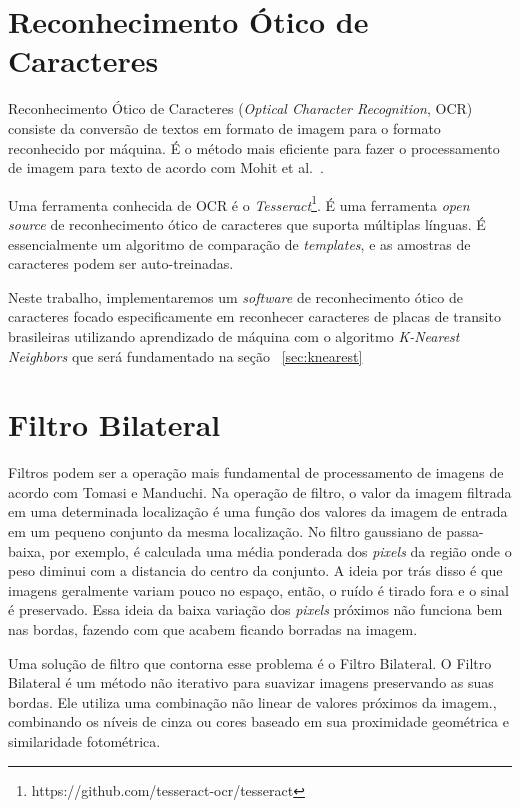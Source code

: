 \section{Reconhecimento Ótico de Caracteres}
\label{sec:ocr}

Reconhecimento Ótico de Caracteres (\emph{Optical Character Recognition}, OCR)
consiste da conversão de textos em formato de imagem para o formato reconhecido
por máquina. É o método mais eficiente para fazer o processamento de imagem para
texto de acordo com Mohit et al.~\cite{mohit2015designing}.

Uma ferramenta conhecida de OCR é o
\emph{Tesseract}\footnote{https://github.com/tesseract-ocr/tesseract}. É uma ferramenta
\emph{open source} de reconhecimento ótico de caracteres que suporta múltiplas
línguas.  É essencialmente um algoritmo de comparação de \emph{templates}, e as
amostras de caracteres podem ser auto-treinadas.~\cite{ho2016intelligent}

Neste trabalho, implementaremos um \emph{software} de reconhecimento ótico de caracteres focado especificamente em reconhecer caracteres de placas de transito brasileiras utilizando aprendizado de máquina com o algoritmo \emph{K-Nearest Neighbors} que será fundamentado na seção ~\ref{sec:knearest}

\section{Filtro Bilateral}
\label{sec:bilateralfilter}

Filtros podem ser a operação mais fundamental de processamento de imagens de acordo com Tomasi e Manduchi\cite{tomasi1998bilateral}. Na operação de filtro, o valor da imagem filtrada em uma determinada localização é uma função dos valores da imagem de entrada em um pequeno conjunto da mesma localização. No filtro gaussiano de passa-baixa, por exemplo, é calculada uma média ponderada dos \emph{pixels} da região onde o peso diminui com a distancia do centro da conjunto. A ideia por trás disso é que imagens geralmente variam pouco no espaço, então, o ruído é tirado fora e o sinal é preservado. Essa ideia da baixa variação dos \emph{pixels} próximos não funciona bem nas bordas, fazendo com que acabem ficando borradas na imagem. \cite{tomasi1998bilateral}

Uma solução de filtro que contorna esse problema é o Filtro Bilateral. O Filtro Bilateral é um método não iterativo para suavizar imagens preservando as suas bordas. Ele utiliza uma combinação não linear de valores próximos da imagem., combinando os níveis de cinza ou cores baseado em sua proximidade geométrica e similaridade fotométrica.\cite{tomasi1998bilateral}

